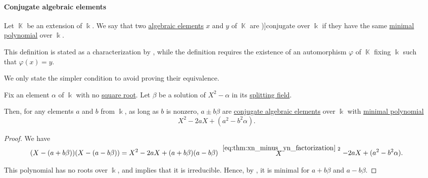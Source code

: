 \paragraph{Conjugate algebraic elements}

\begin{definition}\label{def:conjugate_algebraic_element}
  Let \( \BbbK \) be an extension of \( \Bbbk \). We say that two \hyperref[def:algebraic_element]{algebraic elements} \( x \) and \( y \) of \( \BbbK \) are \term[en=conjugate (elements) (\cite[def. V.9.1]{Bourbaki2003Algebra4to7})]{conjugate} over \( \Bbbk \) if they have the same \hyperref[def:algebraic_element_minimal_polynomial]{minimal polynomial} over \( \Bbbk \).
\end{definition}
\begin{comments}
  \item This definition is stated as a characterization by , while the definition requires the existence of an automorphism \( \varphi \) of \( \BbbK \) fixing \( \Bbbk \) such that \( \varphi(x) = y \).

  We only state the simpler condition to avoid proving their equivalence.
\end{comments}

\begin{proposition}\label{thm:quadratic_conjugate_algebraic_element}
  Fix an element \( \alpha \) of \( \Bbbk \) with no \hyperref[def:semigroup_power]{square root}. Let \( \beta \) be a solution of \( X^2 - \alpha \) in its \hyperref[def:splitting_field]{splitting field}.

  Then, for any elements \( a \) and \( b \) from \( \Bbbk \), as long as \( b \) is nonzero, \( a \pm b \beta \) are \hyperref[def:conjugate_algebraic_element]{conjugate algebraic elements} over \( \Bbbk \) with \hyperref[def:algebraic_element_minimal_polynomial]{minimal polynomial}
  \begin{equation}\label{eq:thm:quadratic_conjugate_algebraic_element/polynomial}
    X^2 - 2aX + (a^2 - b^2 \alpha).
  \end{equation}
\end{proposition}
\begin{proof}
  We have
  \begin{equation*}
    (X - (a + b \beta)) (X - (a - b \beta))
    =
    X^2 - 2aX + (a + b \beta) (a - b \beta)
    \reloset {\eqref{eq:thm:xn_minus_yn_factorization}}
    X^2 - 2aX + (a^2 - b^2 \alpha).
  \end{equation*}

  This polynomial has no roots over \( \Bbbk \), and  implies that it is irreducible. Hence, by , it is minimal for \( a + b \beta \) and \( a - b \beta \).
\end{proof}

